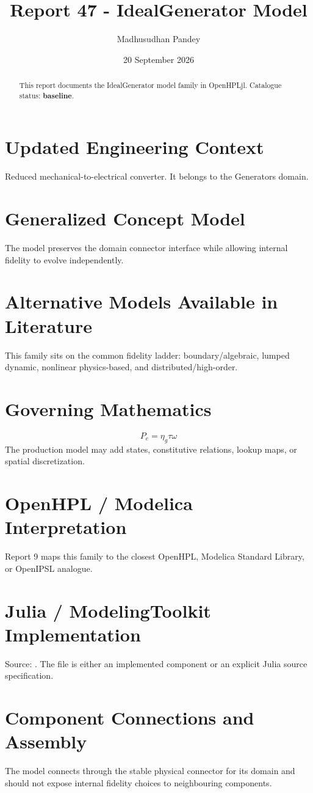 \documentclass[10pt,a4paper]{article}
\title{Report 47 - IdealGenerator Model}
\author{Madhusudhan Pandey}
\date{20 September 2026}
\begin{document}
\maketitle
\begin{abstract}This report documents the IdealGenerator model family in OpenHPLjl. Catalogue status: \textbf{baseline}.\end{abstract}
\section{Updated Engineering Context}Reduced mechanical-to-electrical converter. It belongs to the Generators domain.
\section{Generalized Concept Model}The model preserves the domain connector interface while allowing internal fidelity to evolve independently.
\section{Alternative Models Available in Literature}This family sits on the common fidelity ladder: boundary/algebraic, lumped dynamic, nonlinear physics-based, and distributed/high-order.
\section{Governing Mathematics}\[P_e=\eta_g\tau\omega\]The production model may add states, constitutive relations, lookup maps, or spatial discretization.
\section{OpenHPL / Modelica Interpretation}Report 9 maps this family to the closest OpenHPL, Modelica Standard Library, or OpenIPSL analogue.
\section{Julia / ModelingToolkit Implementation}Source: \texttt{}. The file is either an implemented component or an explicit Julia source specification.
\section{Component Connections and Assembly}The model connects through the stable physical connector for its domain and should not expose internal fidelity choices to neighbouring components.
\end{document}
